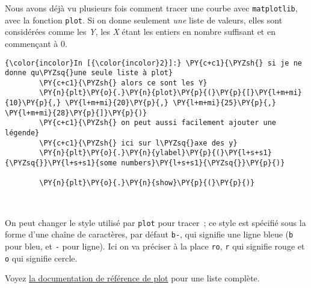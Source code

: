     Nous avons déjà vu plusieurs fois comment tracer une courbe avec
\texttt{matplotlib}, avec la fonction \texttt{plot}. Si on donne
seulement \emph{une} liste de valeurs, elles sont considérées comme les
\emph{Y}, les \emph{X} étant les entiers en nombre suffisant et en
commençant à 0.

    \begin{Verbatim}[commandchars=\\\{\}]
{\color{incolor}In [{\color{incolor}2}]:} \PY{c+c1}{\PYZsh{} si je ne donne qu\PYZsq{}une seule liste à plot}
        \PY{c+c1}{\PYZsh{} alors ce sont les Y}
        \PY{n}{plt}\PY{o}{.}\PY{n}{plot}\PY{p}{(}\PY{p}{[}\PY{l+m+mi}{10}\PY{p}{,} \PY{l+m+mi}{20}\PY{p}{,} \PY{l+m+mi}{25}\PY{p}{,} \PY{l+m+mi}{28}\PY{p}{]}\PY{p}{)}
        \PY{c+c1}{\PYZsh{} on peut aussi facilement ajouter une légende}
        \PY{c+c1}{\PYZsh{} ici sur l\PYZsq{}axe des y}
        \PY{n}{plt}\PY{o}{.}\PY{n}{ylabel}\PY{p}{(}\PY{l+s+s1}{\PYZsq{}}\PY{l+s+s1}{some numbers}\PY{l+s+s1}{\PYZsq{}}\PY{p}{)}
        
        \PY{n}{plt}\PY{o}{.}\PY{n}{show}\PY{p}{(}\PY{p}{)}
\end{Verbatim}


    \begin{center}
    \end{center}
    { \hspace*{\fill} \\}
    
    On peut changer le style utilisé par \texttt{plot} pour tracer~; ce
style est spécifié sous la forme d'une chaîne de caractères, par défaut
\texttt{\textquotesingle{}b-\textquotesingle{}}, qui signifie une ligne
bleue (\texttt{b} pour bleu, et \texttt{-} pour ligne). Ici on va
préciser à la place \texttt{ro}, \texttt{r} qui signifie rouge et
\texttt{o} qui signifie cercle.

Voyez
\href{https://matplotlib.org/2.0.2/api/pyplot_api.html\#matplotlib.pyplot.plot}{la
documentation de référence de plot} pour une liste complète.

